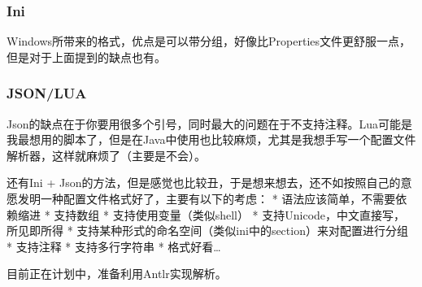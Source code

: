 \documentclass[12pt]{article}
\begin{document}
\subsubsection{Ini}\label{ini}

Windows所带来的格式，优点是可以带分组，好像比Properties文件更舒服一点，但是对于上面提到的缺点也有。

\begin{Shaded}
\begin{Highlighting}[]
\KeywordTok{[curentUser]}
\OtherTok{=}
\OtherTok{=}
\DataTypeTok{ }
\KeywordTok{[database]}\DataTypeTok{ }
\OtherTok{=}
\OtherTok{=}\StringTok{ }
\OtherTok{=}
\end{Highlighting}
\end{Shaded}

\subsubsection{JSON/LUA}\label{jsonlua}

Json的缺点在于你要用很多个引号，同时最大的问题在于不支持注释。Lua可能是我最想用的脚本了，但是在Java中使用也比较麻烦，尤其是我想手写一个配置文件解析器，这样就麻烦了（主要是不会）。

还有Ini + Json的方法，但是感觉也比较丑，于是想来想去，还不如按照自己的意愿发明一种配置文件格式好了，主要有以下的考虑： * 语法应该简单，不需要依赖缩进 * 支持数组 * 支持使用变量（类似shell） * 支持Unicode，中文直接写，所见即所得 * 支持某种形式的命名空间（类似ini中的section）来对配置进行分组 * 支持注释 * 支持多行字符串 * 格式好看\ldots{}

目前正在计划中，准备利用Antlr实现解析。
\end{document}
